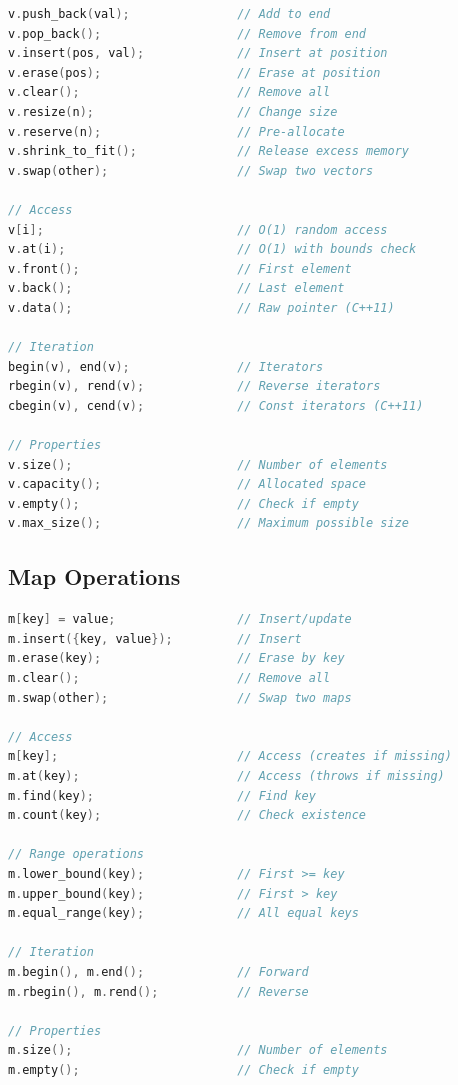 \begin{lstlisting}[language={C++}]
v.push_back(val);               // Add to end
v.pop_back();                   // Remove from end
v.insert(pos, val);             // Insert at position
v.erase(pos);                   // Erase at position
v.clear();                      // Remove all
v.resize(n);                    // Change size
v.reserve(n);                   // Pre-allocate
v.shrink_to_fit();              // Release excess memory
v.swap(other);                  // Swap two vectors

// Access
v[i];                           // O(1) random access
v.at(i);                        // O(1) with bounds check
v.front();                      // First element
v.back();                       // Last element
v.data();                       // Raw pointer (C++11)

// Iteration
begin(v), end(v);               // Iterators
rbegin(v), rend(v);             // Reverse iterators
cbegin(v), cend(v);             // Const iterators (C++11)

// Properties
v.size();                       // Number of elements
v.capacity();                   // Allocated space
v.empty();                      // Check if empty
v.max_size();                   // Maximum possible size
\end{lstlisting}

\hypertarget{map-operations-1}{%
\subsection{Map Operations}\label{map-operations-1}}

\begin{lstlisting}[language={C++}]
m[key] = value;                 // Insert/update
m.insert({key, value});         // Insert
m.erase(key);                   // Erase by key
m.clear();                      // Remove all
m.swap(other);                  // Swap two maps

// Access
m[key];                         // Access (creates if missing)
m.at(key);                      // Access (throws if missing)
m.find(key);                    // Find key
m.count(key);                   // Check existence

// Range operations
m.lower_bound(key);             // First >= key
m.upper_bound(key);             // First > key
m.equal_range(key);             // All equal keys

// Iteration
m.begin(), m.end();             // Forward
m.rbegin(), m.rend();           // Reverse

// Properties
m.size();                       // Number of elements
m.empty();                      // Check if empty
\end{lstlisting}

